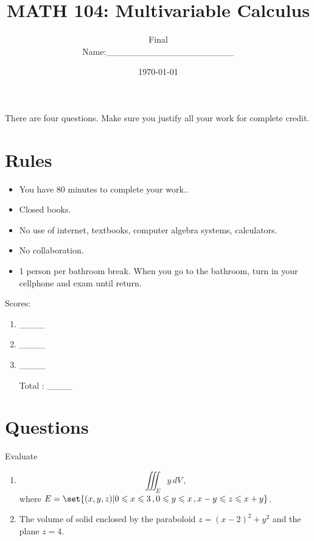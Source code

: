 \documentclass[12pt]{amsart}
\title{ MATH 104: Multivariable Calculus }
\author{Final\\ Name:\_\_\_\_\_\_\_\_\_\_\_\_\_\_\_\_\_\_\_\_}
\date{\today}
\begin{document}
\maketitle

There are four questions. Make sure you justify all your work for complete credit.

\section*{Rules}

\begin{itemize}[leftmargin=*]
	\item You have 80  minutes to complete your work..
	\item Closed books.
	\item No use of internet, textbooks, computer algebra systems, calculators.
	\item No collaboration.
	\item 1 person per bathroom break. When you go to the bathroom, turn in your cellphone and exam until return.
\end{itemize}


Scores:
\begin{enumerate}
	\item \_\_\_\_
	\item \_\_\_\_
	\item \_\_\_\_
	\item[Total]: \_\_\_\_
\end{enumerate}

\newpage

\section*{Questions}
\begin{problem}
Evaluate
\begin{enumerate}
	\item
	      \begin{equation*}
		      \iiint_E y \, dV \,,
	      \end{equation*}
	      where $E = \set{ (x,y,z) | 0 \leq x \leq 3\,, 0\leq y \leq x \,, x - y \leq z \leq x+y  } $.

	      \vspace{8cm}

	\item The volume of solid enclosed by the paraboloid $z = (x-2)^2 + y^2$ and the plane $ z  = 4$.


\end{enumerate}
\end{problem}
\end{document}
